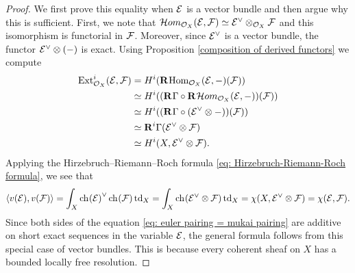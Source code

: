 \begin{proof}
    We first prove this equality when $\mathcal E$ is a vector bundle and then argue why this is sufficient. First, we note that $\localhom[X](\E, \F) \iso \E^\vee \otimes_{\struct{X}} \F$ and this isomorphism is functorial in $\mathcal F$. Moreover, since $\mathcal E^\vee$ is a vector bundle, the functor $\mathcal E^\vee \otimes(-)$ is exact. Using Proposition \ref{composition of derived functors} we compute
    \begin{align*}
        \Ext^i_\struct{X}(\E, \F) &= H^i(\rderived{}{\Hom_{\struct{X}}(\E, -)}(\F)) \\
        &\iso H^i((\rderived{}{\Gamma} \circ \rderived{}{\localhom[X]}(\E, -))(\F)) \\
        &\iso H^i((\rderived{}{\Gamma}\circ(\E^\vee \otimes -))(\F)) \\
        &\iso \rderived{i}{\Gamma}(\E^\vee \otimes \F) \\
        &\iso H^i(X, \E^\vee \otimes \F).
    \end{align*}    
    Applying the Hirzebruch--Riemann--Roch formula \eqref{eq: Hirzebruch-Riemann-Roch formula}, we see that 
    \[
        \pairing{v(\E)}{v(\F)} = \int_X \ch[]{\E}^\vee\ch[]{\F}\tdclass{X} = \int_X \ch[]{\E^\vee \otimes \F}\tdclass{X} = \chi(X, \E^\vee \otimes \F) = \chi(\E, \F).
    \]
    Since both sides of the equation \eqref{eq: euler pairing = mukai pairing} are additive on short exact sequences in the variable $\mathcal E$, the general formula follows from this special case of vector bundles. This is because every coherent sheaf on $X$ has a bounded locally free resolution. 
\end{proof}



